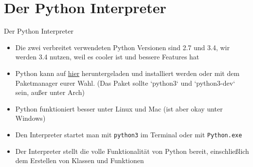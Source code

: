 \documentclass[]{tudbeamer}
\newcommand{\codeline}[1]{\colorbox{codegray}{\lstinline{#1}}}
\begin{document}
\section{Der Python Interpreter}
\begin{frame}{Der Python Interpreter}
	\begin{itemize}
    	\item Die zwei verbreitet verwendeten Python Versionen sind 2.7 und 3.4, wir werden 3.4 nutzen, weil es cooler ist und bessere Features hat
    	\item Python kann auf \href{http://www.python.org}{hier} heruntergeladen und installiert werden oder mit dem Paketmanager eurer Wahl. (Das Paket sollte `python3` und `python3-dev` sein, au\ss{}er unter Arch)
    	\item Python funktioniert besser unter Linux und Mac (ist aber okay unter Windows)
    	\item Den Interpreter startet man mit \codeline{python3} im Terminal oder mit \codeline{Python.exe}
    	\item Der Interpreter stellt die volle Funktionalität von Python bereit, einschlie\ss{}lich dem Erstellen von Klassen und Funktionen
	\end{itemize}
\end{frame}

\end{document}
